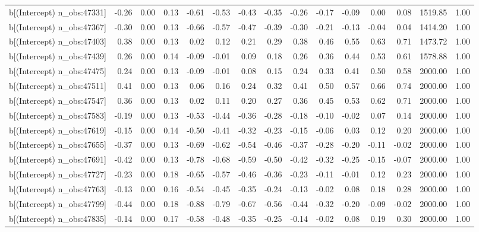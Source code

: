 \begin{table}[ht]
\begin{tabular}{rrrrrrrrrrrrrrr}
  b[(Intercept) n\_obs:47331] & -0.26 & 0.00 & 0.13 & -0.61 & -0.53 & -0.43 & -0.35 & -0.26 & -0.17 & -0.09 & 0.00 & 0.08 & 1519.85 & 1.00 \\ 
  b[(Intercept) n\_obs:47367] & -0.30 & 0.00 & 0.13 & -0.66 & -0.57 & -0.47 & -0.39 & -0.30 & -0.21 & -0.13 & -0.04 & 0.04 & 1414.20 & 1.00 \\ 
  b[(Intercept) n\_obs:47403] & 0.38 & 0.00 & 0.13 & 0.02 & 0.12 & 0.21 & 0.29 & 0.38 & 0.46 & 0.55 & 0.63 & 0.71 & 1473.72 & 1.00 \\ 
  b[(Intercept) n\_obs:47439] & 0.26 & 0.00 & 0.14 & -0.09 & -0.01 & 0.09 & 0.18 & 0.26 & 0.36 & 0.44 & 0.53 & 0.61 & 1578.88 & 1.00 \\ 
  b[(Intercept) n\_obs:47475] & 0.24 & 0.00 & 0.13 & -0.09 & -0.01 & 0.08 & 0.15 & 0.24 & 0.33 & 0.41 & 0.50 & 0.58 & 2000.00 & 1.00 \\ 
  b[(Intercept) n\_obs:47511] & 0.41 & 0.00 & 0.13 & 0.06 & 0.16 & 0.24 & 0.32 & 0.41 & 0.50 & 0.57 & 0.66 & 0.74 & 2000.00 & 1.00 \\ 
  b[(Intercept) n\_obs:47547] & 0.36 & 0.00 & 0.13 & 0.02 & 0.11 & 0.20 & 0.27 & 0.36 & 0.45 & 0.53 & 0.62 & 0.71 & 2000.00 & 1.00 \\ 
  b[(Intercept) n\_obs:47583] & -0.19 & 0.00 & 0.13 & -0.53 & -0.44 & -0.36 & -0.28 & -0.18 & -0.10 & -0.02 & 0.07 & 0.14 & 2000.00 & 1.00 \\ 
  b[(Intercept) n\_obs:47619] & -0.15 & 0.00 & 0.14 & -0.50 & -0.41 & -0.32 & -0.23 & -0.15 & -0.06 & 0.03 & 0.12 & 0.20 & 2000.00 & 1.00 \\ 
  b[(Intercept) n\_obs:47655] & -0.37 & 0.00 & 0.13 & -0.69 & -0.62 & -0.54 & -0.46 & -0.37 & -0.28 & -0.20 & -0.11 & -0.02 & 2000.00 & 1.00 \\ 
  b[(Intercept) n\_obs:47691] & -0.42 & 0.00 & 0.13 & -0.78 & -0.68 & -0.59 & -0.50 & -0.42 & -0.32 & -0.25 & -0.15 & -0.07 & 2000.00 & 1.00 \\ 
  b[(Intercept) n\_obs:47727] & -0.23 & 0.00 & 0.18 & -0.65 & -0.57 & -0.46 & -0.36 & -0.23 & -0.11 & -0.01 & 0.12 & 0.23 & 2000.00 & 1.00 \\ 
  b[(Intercept) n\_obs:47763] & -0.13 & 0.00 & 0.16 & -0.54 & -0.45 & -0.35 & -0.24 & -0.13 & -0.02 & 0.08 & 0.18 & 0.28 & 2000.00 & 1.00 \\ 
  b[(Intercept) n\_obs:47799] & -0.44 & 0.00 & 0.18 & -0.88 & -0.79 & -0.67 & -0.56 & -0.44 & -0.32 & -0.20 & -0.09 & -0.02 & 2000.00 & 1.00 \\ 
  b[(Intercept) n\_obs:47835] & -0.14 & 0.00 & 0.17 & -0.58 & -0.48 & -0.35 & -0.25 & -0.14 & -0.02 & 0.08 & 0.19 & 0.30 & 2000.00 & 1.00 \\ 

\end{tabular}
\end{table}
